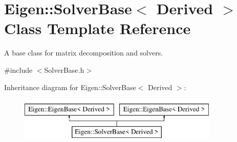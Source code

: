 \hypertarget{class_eigen_1_1_solver_base}{}\section{Eigen\+:\+:Solver\+Base$<$ Derived $>$ Class Template Reference}
\label{class_eigen_1_1_solver_base}


A base class for matrix decomposition and solvers.  




{\ttfamily \#include $<$Solver\+Base.\+h$>$}

Inheritance diagram for Eigen\+:\+:Solver\+Base$<$ Derived $>$\+:\begin{figure}[H]
\begin{center}
\leavevmode
\includegraphics[height=2.000000cm]{class_eigen_1_1_solver_base}
\end{center}
\end{figure}
